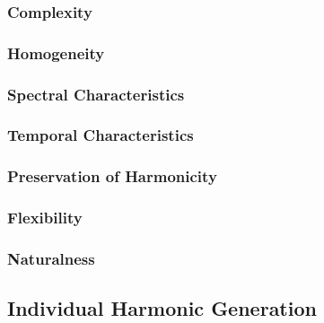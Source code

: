 		\subsubsection*{Complexity}
		\subsubsection*{Homogeneity}
		\subsubsection*{Spectral Characteristics}
		\subsubsection*{Temporal Characteristics}
		\subsubsection*{Preservation of Harmonicity}
		\subsubsection*{Flexibility}
		\subsubsection*{Naturalness}




	\subsection{Individual Harmonic Generation}
	\label{sec:Excitation-Individuals}

